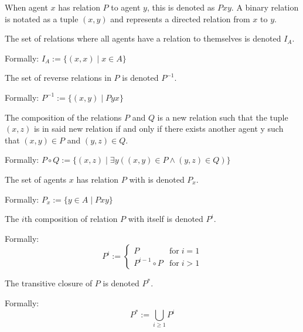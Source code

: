 \begin{definition}
    
\begin{subdefinition}
    When agent \(x\) has relation \(P\) to agent \(y\), this is denoted as \(Pxy\). 
    A binary relation is notated as a tuple \((x,y)\) and represents a directed relation from \(x\) to \(y\).
    \label{def:rel-bin}
\end{subdefinition}

\begin{subdefinition}
    The set of relations where all agents have a relation to themselves is denoted \(I_A\).
    
    Formally: \(I_A := \{(x,x) \mid x \in A\}\)
    \label{def:rel-id}
\end{subdefinition}

\begin{subdefinition}
    The set of reverse relations in \(P\) is denoted \(P^{-1}\).

    Formally: \(P^{-1} := \{(x,y) \mid Pyx\}\)
    \label{def:rel-conv}
\end{subdefinition}

\begin{subdefinition}
    The composition of the relations \(P\) and \(Q\) is a new relation such that the tuple \((x,z)\) is in said new relation if and only if there exists another agent y such that \((x,y) \in P\) and \((y,z) \in Q\).

    Formally: \(P \circ Q := \{(x,z) \mid \exists y ((x, y) \in P \land (y, z) \in Q) \}\)
    \label{def:rel-comp}
\end{subdefinition}

\begin{subdefinition}
    The set of agents \(x\) has relation \(P\) with is denoted \(P_x\).

    Formally: \(P_x := \{ y \in A \mid Pxy \}\)
    \label{def:rel-acq} %
\end{subdefinition}

\begin{subdefinition}
    The \(i\)th composition of relation \(P\) with itself is denoted \(P^i\).

    Formally: 
    \[
        P^i := 
        \begin{cases}
            P               & \text{for} \; i = 1\\
            P^{i-1} \circ P & \text{for} \; i > 1
        \end{cases}
    \]
    \label{def:rel-icomp}
\end{subdefinition}

\begin{subdefinition}
    The transitive closure of \(P\) is denoted \(P^*\).

    Formally:
    \[
        P^* := \bigcup_{i \geq 1} P^i
    \]
    \label{def:rel-star} %
\end{subdefinition}
\end{definition}


